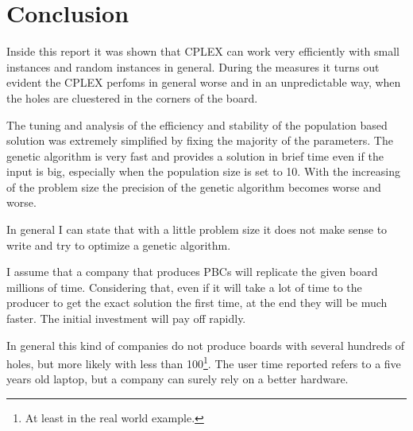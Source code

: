 \section{Conclusion}
Inside this report it was shown that CPLEX can work
very efficiently with small instances and random instances
in general. 
During the measures it turns out evident the CPLEX perfoms
in general worse and in an unpredictable way, when the holes are cluestered in the corners 
of the board. 

The tuning and analysis of the efficiency and stability of the population based solution was extremely
simplified by fixing the majority of the parameters. 
The genetic algorithm is very fast and provides a solution in brief time even if the input is big, especially
when the population size is set to 10. 
With the increasing of the problem size the precision of the genetic algorithm becomes worse and worse.

In general I can state  that with a little problem size it does not make sense to write and try to optimize
a genetic algorithm.

I assume that a company that produces PBCs will replicate the given board millions of time. Considering that, even if it will take a lot of time to the producer to get the exact solution the first time, at the end they will be much faster. The initial investment will pay off rapidly.

In general this kind of companies do not produce boards with several hundreds of holes, but more likely with less than 100\footnote{At least in the real world example.}.
The user time reported refers to a five years old laptop, but a company can surely rely on a better hardware.


 




